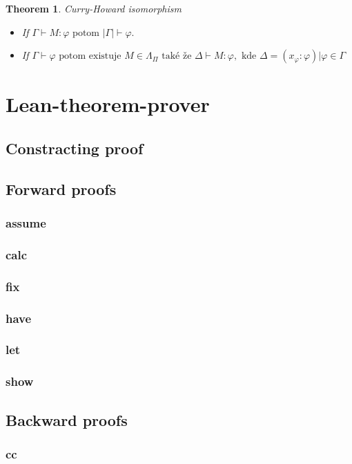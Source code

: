 \documentclass[a4paper,10pt,oneside]{report}%
\newtheorem{theorem}{Theorem}
\begin{document}
\begin{theorem}{Curry-Howard isomorphism}
    \begin{itemize}
        \item If $\Gamma \vdash M : \varphi \textrm{ potom } |\Gamma|  \vdash \varphi.$
        \item If $\Gamma \vdash \varphi \textrm{ potom existuje } M \in \Lambda_{\Pi}
            \textrm{ také že } \Delta \vdash M : \varphi, \textrm{ kde }
            \Delta = { ( x_{\varphi} : \varphi) | \varphi \in \Gamma }$
    \end{itemize}
\end{theorem}


\section{Lean-theorem-prover}
\subsection{Constracting proof}
\subsection{Forward proofs}
    \subsubsection{assume}
    \subsubsection{calc}
    \subsubsection{fix}
    \subsubsection{have}
    \subsubsection{let}
    \subsubsection{show}
\subsection{Backward proofs}
    \subsubsection{cc}
\end{document}
